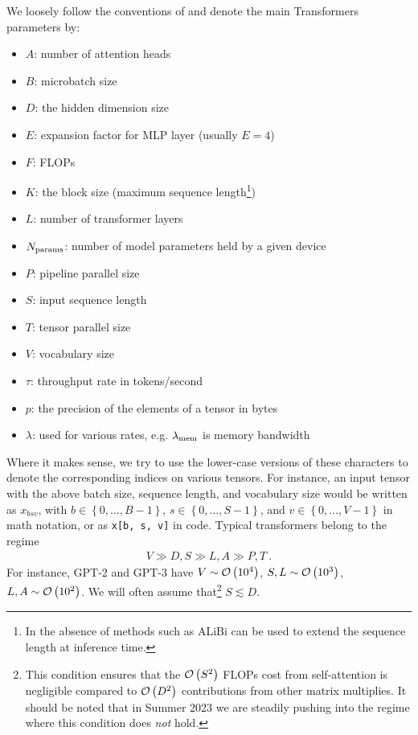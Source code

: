 \documentclass[11pt]{article}
\begin{document}
We loosely follow the conventions of \cite{korthikanti2022reducing} and denote the main Transformers
parameters by:
\begin{itemize}
    \item $ A $: number of attention heads
    \item $ B $: microbatch size
    \item $ D $: the hidden dimension size
    \item $ E $: expansion factor for MLP layer (usually $ E=4 $)
    \item $ F $: FLOPs
    \item $ K $: the block size (maximum sequence length\footnote{In the absence of methods such as         ALiBi \cite{ALiBi}  can be used to extend the sequence length at inference time.})
    \item $ L $: number of transformer layers
    \item $ N _{ {\rm params}  } $: number of model parameters held by a given device
    \item $ P $: pipeline parallel size
    \item $ S $: input sequence length
    \item $ T $: tensor parallel size
    \item $ V $: vocabulary size
    \item $ \tau $: throughput rate in tokens/second
    \item $ p $: the precision of the elements of a tensor in bytes
    \item $ \lambda  $: used for various rates, e.g. $ \lambda _{ {\rm mem}  } $ is memory bandwidth
\end{itemize}
Where it makes sense, we try to use the lower-case versions of these characters to denote the
corresponding indices on various tensors. For instance, an input tensor with the above batch size,
sequence length, and vocabulary size would be written as $ x _{ bsv } $, with $ b \in \left \{ 0,
\ldots, B - 1 \right \} $, $ s \in \left \{ 0, \ldots, S - 1\right \} $, and $  v \in \left \{ 0,
    \ldots, V -1\right \}$ in math notation, or as \texttt{x[b, s, v]} in code.  Typical
    transformers belong to the regime
\begin{gather}
V \gg D, S \gg L, A \gg P, T \ .  \label{app_eq_transformers_approxs}
\end{gather}
For instance, GPT-2 and GPT-3 \cite{gpt2radford2019language, gpt3brown2020language} have $ V \sim \mathcal{O} \left( 10 ^{ 4 } \right)  $,
$ S, L \sim \mathcal{O} \left( 10 ^{ 3 } \right)  $, $ L, A \sim \mathcal{O} \left( 10 ^{ 2 } \right)  $. We
will often assume that\footnote{This condition ensures that the $ \mathcal{O} \left( S ^{ 2 } \right)  $
    FLOPs cost from self-attention is negligible compared to $ \mathcal{O} \left( D ^{ 2 } \right)  $
    contributions from other matrix multiplies.  It should be noted that in Summer 2023 we are
steadily pushing into the regime where this condition does \textit{not}  hold.} $ S \lesssim D $.
\end{document}
